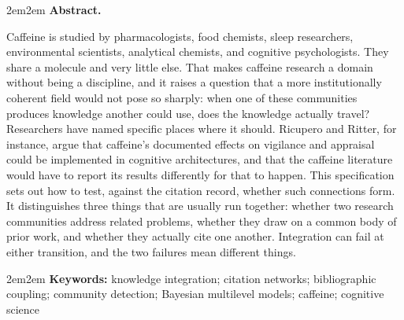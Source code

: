 \documentclass[11pt]{article}
\title{\vspace{-1.5em}#1}
\author{
  \shortstack{
    Jonathan H. Morgan, Ph.D.$^{1}$ \quad Sarah Delmar, Ph.D.$^{2}$
  }
}
\date{
  $^1$\,Duke Network Analysis Center\\
  $^2$\,Department of Psychology, University of Chicago\\
  \today
}
\newenvironment{springerabstract}{
  \begin{adjustwidth}{2em}{2em}
  \noindent\textbf{Abstract.}\hspace{0.5em}\justifying
}{
  \end{adjustwidth}
}
\newcommand{\springerkeywords}[1]{%
  \begin{adjustwidth}{2em}{2em}
  \vspace{1ex}
  \noindent\textbf{Keywords:} #1
  \end{adjustwidth}
}
\begin{document}
\maketitle

\begin{springerabstract}
Caffeine is studied by pharmacologists, food chemists, sleep researchers,
environmental scientists, analytical chemists, and cognitive psychologists. They share
a molecule and very little else. That makes caffeine research a domain without being a
discipline, and it raises a question that a more institutionally coherent field would
not pose so sharply: when one of these communities produces knowledge another could
use, does the knowledge actually travel? Researchers have named specific places where
it should. Ricupero and Ritter, for instance, argue that caffeine's documented effects
on vigilance and appraisal could be implemented in cognitive architectures, and that
the caffeine literature would have to report its results differently for that to
happen. This specification sets out how to test, against the citation record,
whether such connections form. It distinguishes three things that are usually run
together: whether two research communities address related problems, whether they draw
on a common body of prior work, and whether they actually cite one another. Integration can
fail at either transition, and the two failures mean different things.
\end{springerabstract}

\springerkeywords{knowledge integration; citation networks; bibliographic coupling;
community detection; Bayesian multilevel models; caffeine; cognitive science}
\end{document}
